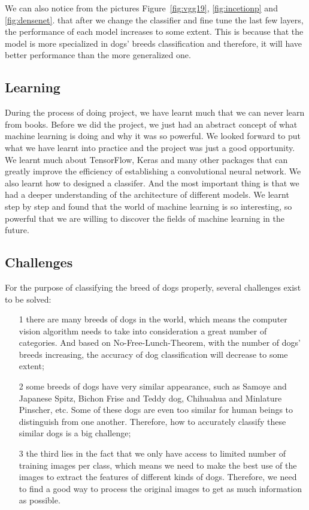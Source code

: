 \documentclass{article}
\begin{document}
We can also notice from the pictures Figure~\ref{fig:vgg19}, \ref{fig:incetionp} and \ref{fig:densenet}. that after we change the classifier and fine tune the last few layers, the performance of each model increases to some extent. This is because that the model is more specialized in dogs' breeds classification and therefore, it will have better performance than the more generalized one. 
\subsection{Learning}
During the process of doing project, we have learnt much that we can never learn from books. Before we did the project, we just had an abstract concept of what machine learning is doing and why it was so powerful. We looked forward to put what we have learnt into practice and the project was just a good opportunity. We learnt much about TensorFlow, Keras and many other packages that can greatly improve the efficiency of establishing a convolutional neural network. We also learnt how to designed a classifer. And the most important thing is that we had a deeper understanding of the architecture of different models. We learnt step by step and found that the world of machine learning is so interesting, so powerful that we are willing to discover the fields of machine learning in the future.
\subsection{Challenges}
For the purpose of classifying the breed of dogs properly, several challenges exist to be solved: 
\begin{itemize}
	\item[1] there are many breeds of dogs in the world, which means the computer vision algorithm needs to take into consideration a great number of categories. And based on No-Free-Lunch-Theorem, with the number of dogs' breeds increasing, the accuracy of dog classification will decrease to some extent; 
	\item[2] some breeds of dogs have very similar appearance, such as Samoye and Japanese Spitz, Bichon Frise and Teddy dog, Chihuahua and Minlature Pinscher, etc. Some of these dogs are even too similar for human beings to distinguish from one another. Therefore, how to accurately classify these similar dogs is a big challenge; 
	\item[3] the third lies in the fact that we only have access to limited number of training images per class, which means we need to make the best use of the images to extract the features of different kinds of dogs. Therefore, we need to find a good way to process the original images to get as much information as possible. 
\end{itemize}
\end{document}
